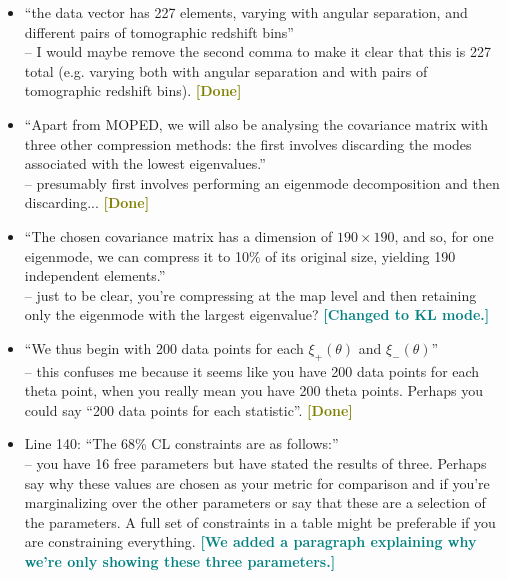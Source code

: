 \documentclass{article}
\newcommand\reply[1]{{\bf {\textcolor{teal}{[#1]}}}}
\newcommand\done{{\bf {\textcolor{olive}{[Done]}}}}
\begin{document}
	\begin{itemize}
		
		\item “the data vector has 227 elements, varying with angular separation, and different pairs of tomographic redshift bins” \\
		– I would maybe remove the second comma to make it clear that this is 227 total (e.g. varying both with angular separation and with pairs of tomographic redshift bins). \done
		
		\item “Apart from MOPED, we will also be analysing the covariance matrix with three other compression methods: the first involves discarding the modes associated with the lowest eigenvalues.” \\ 
		– presumably first involves performing an eigenmode decomposition and then discarding... \done
		
		\item “The chosen covariance matrix has a dimension of $190\times190$, and so, for one eigenmode, we can compress it to 10\% of its original size, yielding 190 independent elements.” \\ 
		– just to be clear, you’re compressing at the map level and then retaining only the eigenmode with the largest eigenvalue? \reply{Changed to KL mode.}
		
		\item “We thus begin with 200 data points for each $\xi_+(\theta)$ and $\xi_-(\theta)$” \\ 
		– this confuses me because it seems like you have 200 data points for each theta point, when you really mean you have 200 theta points. Perhaps you could say “200 data points for each statistic”. \done
		
		\item Line 140: “The 68\% CL constraints are as follows:” \\ 
		– you have 16 free parameters but have stated the results of three. Perhaps say why these values are chosen as your metric for comparison and if you’re marginalizing over the other parameters or say that these are a selection of the parameters. A full set of constraints in a table might be preferable if you are constraining everything. \reply{We added a paragraph explaining why we're only showing these three parameters.}
		

\end{itemize}
\end{document}
